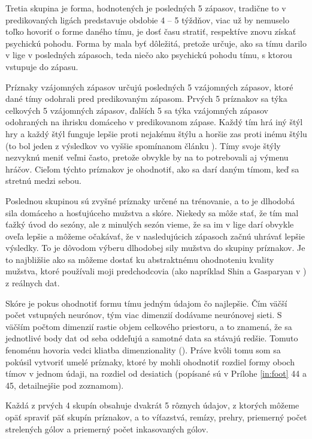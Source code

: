 Tretia skupina je forma, hodnotených je posledných 5 zápasov, tradične to v predikovaných ligách predstavuje obdobie 4 -- 5 týždňov, viac už by nemuselo toľko hovoriť o forme daného tímu, je dosť času stratiť, respektíve znovu získať psychickú pohodu. Forma by mala byť dôležitá, pretože určuje, ako sa tímu darilo v lige v posledných zápasoch, teda niečo ako psychickú pohodu tímu, s ktorou vstupuje do zápasu.

Príznaky vzájomných zápasov určujú posledných 5 vzájomných zápasov, ktoré dané tímy odohrali pred predikovaným zápasom. Prvých 5 príznakov sa týka celkových 5 vzájomných zápasov, ďalších 5 sa týka vzájomných zápasov odohraných na ihrisku domáceho v predikovanom zápase. Každý tím hrá iný štýl hry a každý štýl funguje lepšie proti nejakému štýlu a horšie zas proti inému štýlu (to bol jeden z výsledkov vo vyššie spomínanom článku \citep{related:shin}). Tímy svoje štýly nezvyknú meniť veľmi často, pretože obvykle by na to potrebovali aj výmenu hráčov. Cieľom týchto príznakov je ohodnotiť, ako sa darí daným tímom, keď sa stretnú medzi sebou.

Poslednou skupinou sú zvyšné príznaky určené na trénovanie, a to je dlhodobá sila domáceho a hosťujúceho mužstva a skóre. 
Niekedy sa môže stať, že tím mal ťažký úvod do sezóny, ale z minulých sezón vieme, že sa im v lige darí obvykle oveľa lepšie a môžeme očakávať, že v nasledujúcich zápasoch začnú uhrávať lepšie výsledky. 
To je dôvodom výberu dlhodobej sily mužstva do skupiny príznakov.
Je to najbližšie ako sa môžeme dostať ku abstraktnému ohodnoteniu kvality mužstva, ktoré používali moji predchodcovia (ako napríklad Shin a Gasparyan v \citep{related:shin}) z reálnych dat.

Skóre je pokus ohodnotiť formu tímu jedným údajom čo najlepšie.
Čím väčší počet vstupných neurónov, tým viac dimenzií dodávame neurónovej sieti.
S väčším počtom dimenzií rastie objem celkového priestoru, a to znamená, že sa jednotlivé body dat od seba oddeľujú a samotné data sa stávajú redšie.
Tomuto fenoménu hovoria vedci kliatba dimenzionality (\citep{curse}).
Práve kvôli tomu som sa pokúsil vytvoriť umelé príznaky, ktoré by mohli ohodnotiť rozdiel formy oboch tímov v jednom údaji, na rozdiel od desiatich (popísané sú v Prílohe \ref{in:foot} 44 a 45, detailnejšie pod zoznamom).

Každá z prvých 4 skupín obsahuje dvakrát 5 rôznych údajov, z ktorých môžeme opäť spraviť päť skupín príznakov, a to víťazstvá, remízy, prehry, priemerný počet strelených gólov a priemerný počet inkasovaných gólov.

